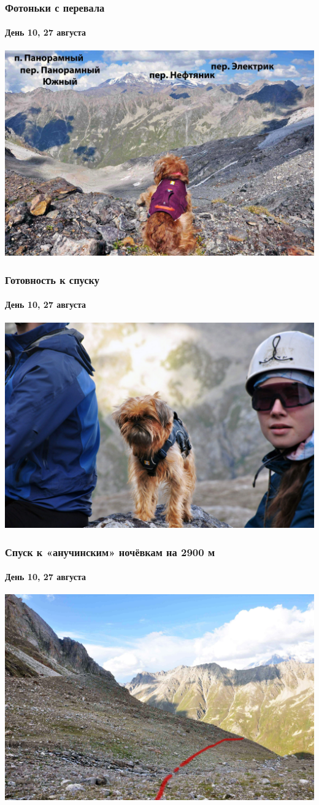 \begin{frame}
	\frametitle{Фотоньки с перевала}
	\framesubtitle{День 10, 27 августа}
	\centering
	\includegraphics[width=\textwidth]{../pics/DSC_0385 2}			
\end{frame}


\begin{frame}
	\frametitle{Готовность к спуску}
	\framesubtitle{День 10, 27 августа}
	\centering
	\includegraphics[width=\textwidth]{../pics/DSC_0428 2}			
\end{frame}

\begin{frame}
	\frametitle{Спуск к «анучинским» ночёвкам на 2900 м}
	\framesubtitle{День 10, 27 августа}
	\centering
	\includegraphics[width=\textwidth]{../pics/DSC_0425 2}			
\end{frame}

